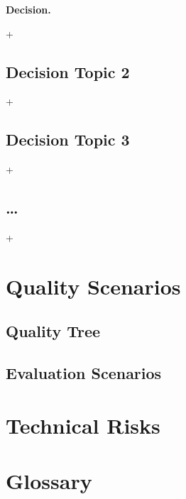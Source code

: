 \documentclass[]{article}
\begin{document}
\textbf{Decision.}

+

\subsection{Decision Topic 2}

+

\subsection{Decision Topic 3}

+

\subsection{\ldots{}}

+

\section{Quality Scenarios}

\subsection{Quality Tree}

\subsection{Evaluation Scenarios}

\section{Technical Risks}

\section{Glossary}
\end{document}
